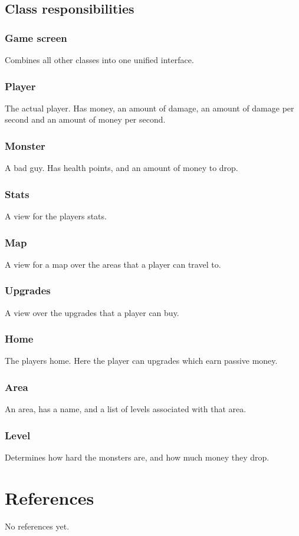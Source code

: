 \documentclass{article}
\begin{document}
\subsection{Class responsibilities}
\subsubsection{Game screen}
Combines all other classes into one unified interface.
\subsubsection{Player}
The actual player. Has money, an amount of damage, an amount of damage per second and an amount of money per second.
\subsubsection{Monster}
A bad guy. Has health points, and an amount of money to drop.
\subsubsection{Stats}
A view for the players stats.
\subsubsection{Map}
A view for a map over the areas that a player can travel to.
\subsubsection{Upgrades}
A view over the upgrades that a player can buy.
\subsubsection{Home}
The players home. Here the player can upgrades which earn passive money. 
\subsubsection{Area}
An area, has a name, and a list of levels associated with that area.
\subsubsection{Level}
Determines how hard the monsters are, and how much money they drop.
\section{References}
No references yet.
\end{document}
